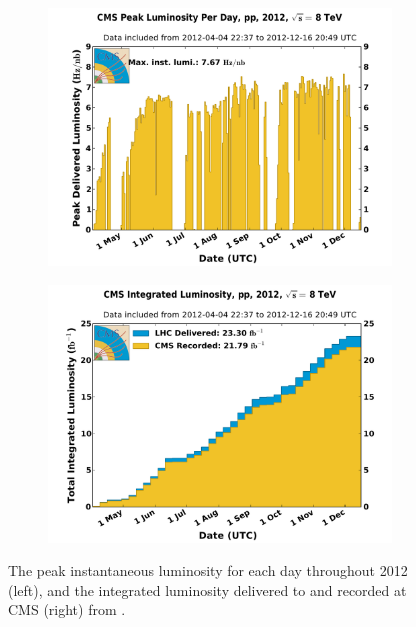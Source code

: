 \begin{figure}[h!]
  \centering
  \begin{subfigure}[b]{0.46\textwidth}
    \includegraphics[width=\textwidth]{Figs/machine/peak_lumi_per_day_pp_2012.pdf}
    \label{fig:inst_lumi_day}
  \end{subfigure}
  \begin{subfigure}[b]{0.46\textwidth}
    \includegraphics[width=\textwidth]{Figs/machine/int_lumi_per_week_cumulative_pp_2012.pdf}
    \label{fig:int_lumi_week_cumu}
  \end{subfigure}
  \caption{The peak instantaneous luminosity for each day throughout 2012 (left),
  and the integrated luminosity delivered to and recorded at CMS (right)
  from \cite{cmslumi}.}
  \label{fig:lumi_2012}
\end{figure}

